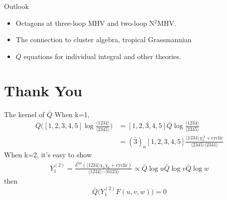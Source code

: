 \documentclass[10pt]{beamer}
\begin{document}

\begin{frame}{Outlook}

\begin{itemize}
  \item Octagons at three-loop MHV and two-loop N$^{2}$MHV.
  \item The connection to cluster algebra, tropical Grassmannian
  \item $\bar{Q}$ equations for individual integral and other theories.
\end{itemize}


\end{frame}

\section*{Thank You}

\appendix
\iffalse
\only<2> { \item For $k=1$, it's non-trivial, since   
\begin{align*}
\bar{Q} [1,2,3,4,5]\log\frac{\langle1234\rangle}{\langle2345\rangle} &= [1,2,3,4,5]\bar{Q} \log\frac{\langle1234\rangle}{\langle2345\rangle} \\
  &= (\bar{3})_{a} [1,2,3,4,5]\frac{\langle 1234\rangle\chi^{A}_{5}+\text{cyclic}}{\langle2345\rangle\langle 2341\rangle}
\end{align*}}
one example:
\begin{align*}
  Y_{1}^{(2)} \propto \bar{Q}\log u\bar{Q}\log v\bar{Q}\log w
\end{align*}
then it is easy to see that 
\[
\bar{Q}\bigl(Y_{1}^{2}F(u,v,w)\bigr) =0 
\]
for any function $F$ of $u,v,w$.
\fi

\begin{frame}{The kernel of $\bar{Q}$}
  When k=1,
  \begin{align*}
    \bar{Q} \biggl([1,2,3,4,5]\log\frac{\langle1234\rangle}{\langle2345\rangle}\biggr) &= [1,2,3,4,5]\bar{Q} \log\frac{\langle1234\rangle}{\langle2345\rangle} \\
      &= (\bar{3})_{a} [1,2,3,4,5]\frac{\langle 1234\rangle\chi^{A}_{5}+\text{cyclic}}{\langle2345\rangle\langle 2341\rangle}
    \end{align*}
    When k=2, it's easy to show 
    \begin{align*}
      Y_{1}^{(2)}=\frac{\delta^{0\vert 4}(\langle 1234\rangle\chi_{5}\chi_{6}+\text{cyclic})}{\langle 1234\rangle\cdots \langle 6123\rangle} \propto \bar{Q}\log u\bar{Q}\log v\bar{Q}\log w
    \end{align*}
    then 
    \begin{equation*}
    \bar{Q}\bigl(Y_{1}^{(2)}F(u,v,w)\bigr)=0
    \end{equation*}
\end{frame}
\end{document}
